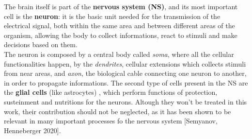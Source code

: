 \documentclass[a4paper]{article}
\begin{document}
	The brain itself is part of the \textbf{nervous system (NS)}, and its most important cell is the \textbf{neuron}: it is the basic unit needed for the transmission of the electrical signal, both within the same area and between different areas of the organism, allowing the body to collect informations, react to stimuli and make decisions based on them. \\
	The neuron is composed by a central body called \textit{soma}, where all the cellular functionalities happen, by the \textit{dendrites}, cellular extensions which collects stimuli from near areas, and \textit{axon}, the biological cable connecting one neuron to another, in order to propagate informations. 
	The second type of cells present in the NS are the \textbf{glial cells} (like astrocytes) , which perform functions of protection, susteinment and nutritions for the neurons. Altough they won't be treated in this work, their contribution should not be neglected, as it has been shown to be relevant in many important processes fo the nervous system [Semyanov, Henneberger 2020]. \\
	
		
	
\end{document}
